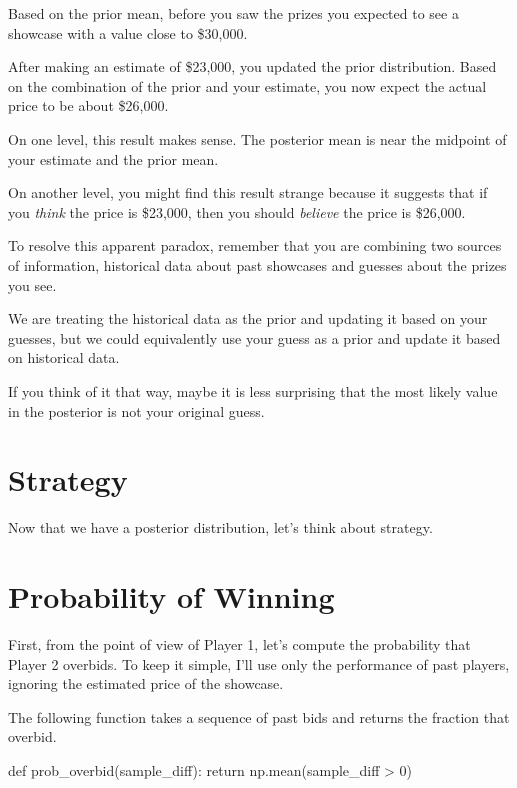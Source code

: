 \documentclass[12pt]{book}
\theoremstyle{exercise}
\begin{document}
Based on the prior mean, before you saw the prizes you expected to see a showcase with a value close to \$30,000.

After making an estimate of \$23,000, you updated the prior distribution.
Based on the combination of the prior and your estimate, you now expect the actual price to be about \$26,000.

On one level, this result makes sense.  
The posterior mean is near the midpoint of your estimate and the prior mean.

On another level, you might find this result strange because it
suggests that if you {\em think} the price is \$23,000, then you
should {\em believe} the price is \$26,000.

To resolve this apparent paradox, remember that you are combining two
sources of information, historical data about past showcases and
guesses about the prizes you see.

We are treating the historical data as the prior and updating it
based on your guesses, but we could equivalently use your guess
as a prior and update it based on historical data.  

If you think of it that way, maybe it is less surprising that the
most likely value in the posterior is not your original guess.

\section{Strategy}

Now that we have a posterior distribution, let's think about strategy.




\section{Probability of Winning}

First, from the point of view of Player 1, let's compute the probability that Player 2 overbids.  
To keep it simple, I'll use only the performance of past players, ignoring the estimated price of the showcase. 

The following function takes a sequence of past bids and returns the fraction that overbid.

\begin{code}
def prob_overbid(sample_diff):
    return np.mean(sample_diff > 0)
\end{code}
\end{document}
